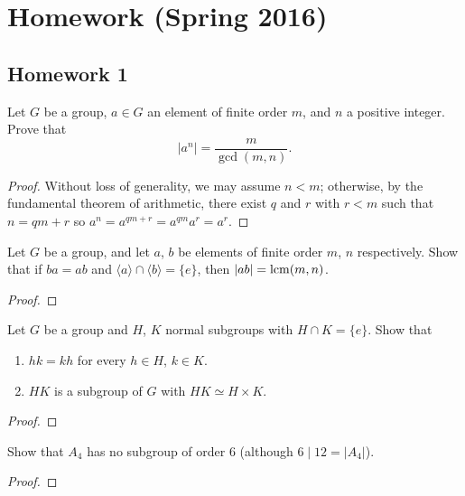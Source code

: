 \chapter{Homework (Spring 2016)}
\thispagestyle{empty}
\setcounter{exercise}{0}
\setcounter{equation}{0}
\section{Homework 1}
\begin{problem}
Let $G$ be a group, $a\in G$ an element of finite order $m$, and $n$ a
positive integer. Prove that
\[
|a^n|=\frac{m}{\gcd(m,n)}.
\]
\end{problem}
\begin{proof}
Without loss of generality, we may assume $n<m$; otherwise, by the
fundamental theorem of arithmetic, there exist $q$ and $r$ with $r<m$ such
that $n=qm+r$ so $a^n=a^{qm+r}=a^{qm}a^r=a^r$.
\end{proof}

\begin{problem}
Let $G$ be a group, and let $a$, $b$ be elements of finite order $m$, $n$
respectively. Show that if $ba=ab$ and $\langle a\rangle\cap\langle
b\rangle=\{e\}$, then $|ab|=\operatorname{lcm}(m,n)$.
\end{problem}
\begin{proof}
\end{proof}

\begin{problem}
Let $G$ be a group and $H$, $K$ normal subgroups with $H\cap K=\{e\}$. Show
that
\begin{enumerate}[label=(\alph*)]
\item $hk=kh$ for every $h\in H$, $k\in K$.
\item $HK$ is a subgroup of $G$ with $HK\simeq H\times K$.
\end{enumerate}
\end{problem}
\begin{proof}
\end{proof}

\begin{problem}
Show that $A_4$ has no subgroup of order $6$ (although $6\mid 12=|A_4|$).
\end{problem}
\begin{proof}
\end{proof}

